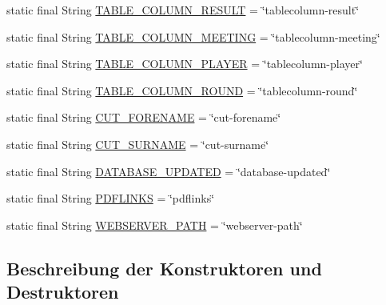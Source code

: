 \begin{DoxyCompactItemize}
\item 
static final String \hyperlink{classde_1_1turnierverwaltung_1_1control_1_1_properties_control_a2f72360f64a699d6b65ecd2b804be3ce}{T\+A\+B\+L\+E\+\_\+\+C\+O\+L\+U\+M\+N\+\_\+\+R\+E\+S\+U\+LT} = \char`\"{}tablecolumn-\/result\char`\"{}
\item 
static final String \hyperlink{classde_1_1turnierverwaltung_1_1control_1_1_properties_control_a65f546557fd470f93b2283d70a7eec9e}{T\+A\+B\+L\+E\+\_\+\+C\+O\+L\+U\+M\+N\+\_\+\+M\+E\+E\+T\+I\+NG} = \char`\"{}tablecolumn-\/meeting\char`\"{}
\item 
static final String \hyperlink{classde_1_1turnierverwaltung_1_1control_1_1_properties_control_af22d6d25bb009d5ae1f8d5c55aef07b5}{T\+A\+B\+L\+E\+\_\+\+C\+O\+L\+U\+M\+N\+\_\+\+P\+L\+A\+Y\+ER} = \char`\"{}tablecolumn-\/player\char`\"{}
\item 
static final String \hyperlink{classde_1_1turnierverwaltung_1_1control_1_1_properties_control_a8e130912ad746248dcd43f012007578a}{T\+A\+B\+L\+E\+\_\+\+C\+O\+L\+U\+M\+N\+\_\+\+R\+O\+U\+ND} = \char`\"{}tablecolumn-\/round\char`\"{}
\item 
static final String \hyperlink{classde_1_1turnierverwaltung_1_1control_1_1_properties_control_a386f77b2e0831f104bf2309519defeba}{C\+U\+T\+\_\+\+F\+O\+R\+E\+N\+A\+ME} = \char`\"{}cut-\/forename\char`\"{}
\item 
static final String \hyperlink{classde_1_1turnierverwaltung_1_1control_1_1_properties_control_a40a8351a7b9c4ec6cf12af3312b141cd}{C\+U\+T\+\_\+\+S\+U\+R\+N\+A\+ME} = \char`\"{}cut-\/surname\char`\"{}
\item 
static final String \hyperlink{classde_1_1turnierverwaltung_1_1control_1_1_properties_control_a4b769ad4dc0f0c17f5306f49f8c2ffea}{D\+A\+T\+A\+B\+A\+S\+E\+\_\+\+U\+P\+D\+A\+T\+ED} = \char`\"{}database-\/updated\char`\"{}
\item 
static final String \hyperlink{classde_1_1turnierverwaltung_1_1control_1_1_properties_control_a608993502758a32bd96ebe6d96d9a77d}{P\+D\+F\+L\+I\+N\+KS} = \char`\"{}pdflinks\char`\"{}
\item 
static final String \hyperlink{classde_1_1turnierverwaltung_1_1control_1_1_properties_control_a2788458e7f7dbb585a6ce34b379cedd6}{W\+E\+B\+S\+E\+R\+V\+E\+R\+\_\+\+P\+A\+TH} = \char`\"{}webserver-\/path\char`\"{}
\end{DoxyCompactItemize}


\subsection{Beschreibung der Konstruktoren und Destruktoren}
